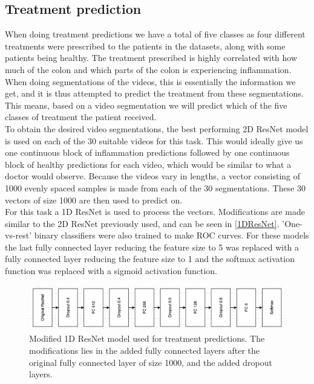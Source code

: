 \subsection{Treatment prediction}\label{treatmentprediction}
When doing treatment predictions we have a total of five classes as four different treatments were prescribed to the patients in the datasets, along with some patients being healthy. The treatment prescribed is highly correlated with how much of the colon and which parts of the colon is experiencing inflammation. When doing segmentations of the videos, this is essentially the information we get, and it is thus attempted to predict the treatment from these segmentations. This means, based on a video segmentation we will predict which of the five classes of treatment the patient received.\\
To obtain the desired video segmentations, the best performing 2D ResNet model is used on each of the 30 suitable videos for this task. This would ideally give us one continuous block of inflammation predictions followed by one continuous block of healthy predictions for each video, which would be similar to what a doctor would observe. Because the videos vary in lengths, a vector consisting of 1000 evenly spaced samples is made from each of the 30 segmentations. These 30 vectors of size 1000 are then used to predict on.\\
For this task a 1D ResNet is used to process the vectors. Modifications are made similar to the 2D ResNet previously used, and can be seen in \autoref{1DResNet}. 'One-vs-rest' binary classifiers were also trained to make ROC curves. For these models the last fully connected layer reducing the feature size to 5 was replaced with a fully connected layer reducing the feature size to 1 and the softmax activation function was replaced with a sigmoid activation function.

\begin{figure}[H]
	\centering
	\includegraphics[width=\linewidth]{Materials/Methods/Mod1DResNet}
	\caption{Modified 1D ResNet model used for treatment predictions. The modifications lies in the added fully connected layers after the original fully connected layer of size 1000, and the added dropout layers.}
	\label{1DResNet}
\end{figure}

